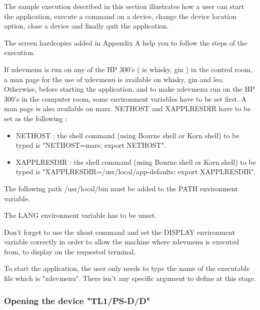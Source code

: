 %
%
%
%
%
%
%
%
%
%
The sample execution described in this section illustrates how a user can
start the application, execute a command on a device, change the device
location option, close a device and finally quit the application.

The screen hardcopies added in Appendix A help you to follow the steps of
the execution.

If xdevmenu is run on any of the HP 300's ( ie whisky, gin ) in the control 
room, a man page for the use of xdevmenu is available on whisky, gin and leo. 
Otherwise, 
before starting the application, and to make xdevmenu run on the HP 300's in the computer room, some environment variables have to be set first.
 A man page is also available on mars. 
NETHOST and XAPPLRESDIR have to be set as the following :
\begin{itemize}
\item
{ NETHOST : }the shell command (using Bourne shell or Korn shell) to be typed
is "NETHOST=mars; export NETHOST".
\item
{ XAPPLRESDIR : }the shell command (using Bourne shell or Korn shell) to be typed
is "XAPPLRESDIR=/usr/local/app-defaults; export XAPPLRESDIR".
\end{itemize}

The following path  /usr/local/bin  must be added to the
PATH environment variable.

The LANG environment variable has to be unset.

Don't forget to use the xhost command and set the DISPLAY environment variable 
correctly in order to allow the machine where xdevmenu is executed from, to display on the requested terminal.

To start the application, the user only needs to type the name of the executable
file which is "xdevmenu". There isn't any specific argument to define at
this stage.

\subsubsection{Opening the device "TL1/PS-D/D"}

